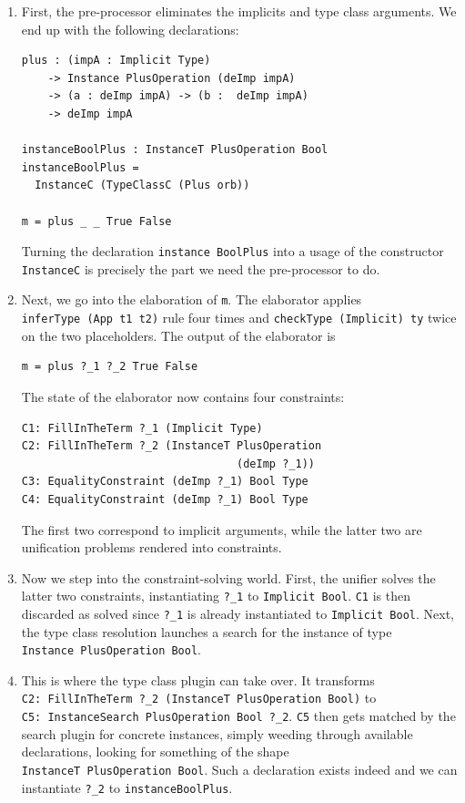 \begin{enumerate}
\def\labelenumi{\arabic{enumi}.}
\item
  First, the pre-processor eliminates the implicits and type class
  arguments. We end up with the following declarations:

\begin{verbatim}
plus : (impA : Implicit Type)
    -> Instance PlusOperation (deImp impA)
    -> (a : deImp impA) -> (b :  deImp impA)
    -> deImp impA

instanceBoolPlus : InstanceT PlusOperation Bool
instanceBoolPlus =
  InstanceC (TypeClassC (Plus orb))

m = plus _ _ True False
\end{verbatim}

  Turning the declaration \texttt{instance\ BoolPlus} into a usage of
  the constructor \texttt{InstanceC} is precisely the part we need the
  pre-processor to do.
\item
  Next, we go into the elaboration of \texttt{m}. The elaborator applies
  \texttt{inferType\ (App\ t1\ t2)} rule four times and
  \texttt{checkType\ (Implicit)\ ty} twice on the two placeholders. The
  output of the elaborator is

\begin{verbatim}
m = plus ?_1 ?_2 True False
\end{verbatim}

  The state of the elaborator now contains four constraints:

\begin{verbatim}
C1: FillInTheTerm ?_1 (Implicit Type)
C2: FillInTheTerm ?_2 (InstanceT PlusOperation
                                 (deImp ?_1))
C3: EqualityConstraint (deImp ?_1) Bool Type
C4: EqualityConstraint (deImp ?_1) Bool Type
\end{verbatim}

  The first two correspond to implicit arguments, while the latter two
  are unification problems rendered into constraints.
\item
  Now we step into the constraint-solving world. First, the unifier
  solves the latter two constraints, instantiating \texttt{?\_1} to
  \texttt{Implicit\ Bool}. \texttt{C1} is then discarded as solved since
  \texttt{?\_1} is already instantiated to \texttt{Implicit\ Bool}.
  Next, the type class resolution launches a search for the instance of
  type \texttt{Instance\ PlusOperation\ Bool}.
\item
  This is where the type class plugin can take over. It transforms
  \texttt{C2:\ FillInTheTerm\ ?\_2\ (InstanceT\ PlusOperation\ Bool)} to
  \texttt{C5:\ InstanceSearch\ PlusOperation\ Bool\ ?\_2}. \texttt{C5}
  then gets matched by the search plugin for concrete instances, simply
  weeding through available declarations, looking for something of the
  shape \texttt{InstanceT\ PlusOperation\ Bool}. Such a declaration
  exists indeed and we can instantiate \texttt{?\_2} to
  \texttt{instanceBoolPlus}.
\end{enumerate}

